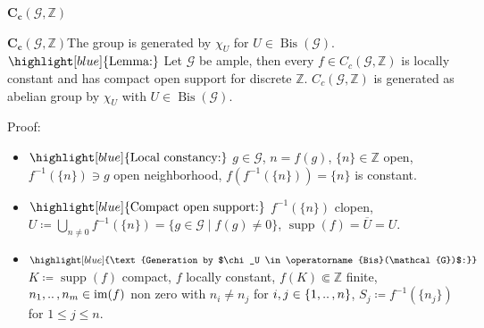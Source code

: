 \documentclass[aspectratio=169]{beamer}
\renewcommand{\ldots}{
  \mathinner{{\ldotp}{\ldotp}}
}
\newcommand{\G}{\mathcal{G}}
\newcommand{\ZZ}{\mathbb{Z}}
\begin{document}

\begin{frame}[plain,c]
  \begin{center}
    \Huge $\boldsymbol{C_c(\G,\ZZ)}$
  \end{center}
\end{frame}

\begin{frame}{$\boldsymbol{C_c(\G,\ZZ)}$}{The group is generated by $\chi_U$ for $U \in \operatorname{Bis}(\G)$.}
    \(\highlight[blue]{\text{Lemma:}}\)  Let $\G$ be ample, then every $f \in C_c(\G,\ZZ)$ is locally constant and has compact open support for discrete $\ZZ$. $C_c(\G,\ZZ)$ is generated as abelian group by $\chi_U$ with $U \in \operatorname{Bis}(\G)$.
    \vspace{0.2cm}
    
    Proof:\pause
    \begin{itemize}
        \item \(\highlight[blue]{\text{Local constancy:}}\) $g \in \G$, $n = f(g)$, $\{n\} \in \ZZ$ open, $f^{-1}(\{n\}) \ni g$ open neighborhood, $f(f^{-1}(\{n\})) = \{n\}$ is constant.\pause
        \item \(\highlight[blue]{\text{Compact open support:}}\) $f^{-1}(\{n\})$ clopen, $U \coloneqq \bigcup_{n \neq 0} f^{-1}(\{n\}) = \{g \in \G \mid f(g) \neq 0\}$, $\operatorname{supp}(f) = \overline{U} = U$.\pause
        \item \(\highlight[blue]{\text{Generation by $\chi_U \in \operatorname{Bis}(\G)$:}}\) $K \coloneqq \operatorname{supp}(f)$ compact, $f$ locally constant, $f(K) \Subset \ZZ$ finite, $n_1, \ldots, n_m \in \operatorname{im}(f)$ non zero with $n_i \neq n_j$ for $i,j \in \{1, \ldots,n\}$, $S_j \coloneqq f^{-1}(\{n_j\})$ for $1 \leq j \leq n$.
    \end{itemize}
\end{frame}
\end{document}
